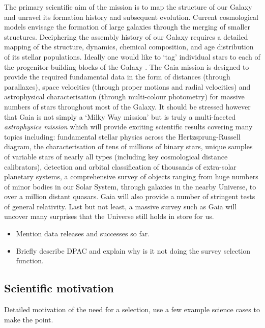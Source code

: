 The primary scientific aim of the mission is to map the structure of our Galaxy and unravel its formation history and
subsequent evolution. Current cosmological models envisage the formation of large galaxies through the merging of
smaller structures. Deciphering the assembly history of our Galaxy requires a detailed mapping of the structure,
dynamics, chemical composition, and age distribution of its stellar populations. Ideally one would like to `tag'
individual stars to each of the progenitor building blocks of the Galaxy \cite{2002ARA&A..40..487F}. The Gaia mission is
designed to provide the required fundamental data in the form of distances (through parallaxes), space velocities
(through proper motions and radial velocities) and astrophysical characterisation (through multi-colour photometry) for
massive numbers of stars throughout most of the Galaxy. It should be stressed however that Gaia is not simply a `Milky
Way mission' but is truly a multi-faceted {\em astrophysics mission} which will provide exciting scientific results
covering many topics including: fundamental stellar physics across the Hertzsprung-Russell diagram, the characterisation of
tens of millions of binary stars, unique samples of variable stars of nearly all types (including key cosmological
distance calibrators), detection and orbital classification of thousands of extra-solar planetary systems, a
comprehensive survey of objects ranging from huge numbers of minor bodies in our Solar System, through galaxies in the
nearby Universe, to over a million distant quasars. Gaia will also provide a number of stringent tests of general
relativity. Last but not least, a massive survey such as Gaia will uncover many surprises that the Universe still holds
in store for us.

\begin{itemize}
    \item Mention data releases and successes so far.
    \item Briefly describe DPAC and explain why is it not doing the survey selection function.
\end{itemize}

\subsection{Scientific motivation}
\label{sec:scientific-motivation}

Detailed motivation of the need for a selection, use a few example science cases to make the point.

